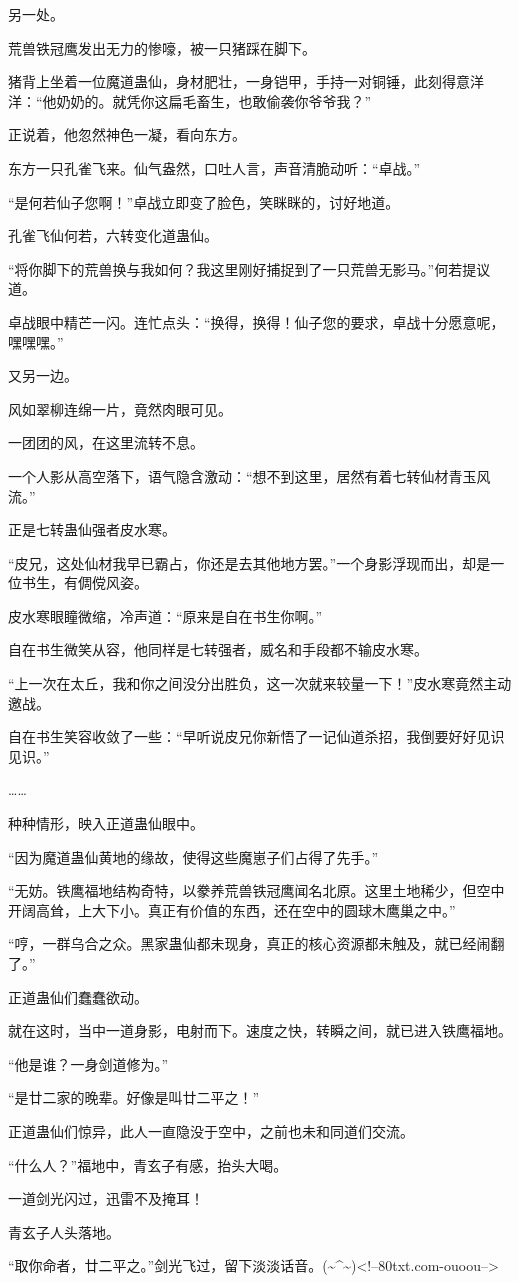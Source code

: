 \begin{this_body}
另一处。

荒兽铁冠鹰发出无力的惨嚎，被一只猪踩在脚下。

猪背上坐着一位魔道蛊仙，身材肥壮，一身铠甲，手持一对铜锤，此刻得意洋洋：“他奶奶的。就凭你这扁毛畜生，也敢偷袭你爷爷我？”

正说着，他忽然神色一凝，看向东方。

东方一只孔雀飞来。仙气盎然，口吐人言，声音清脆动听：“卓战。”

“是何若仙子您啊！”卓战立即变了脸色，笑眯眯的，讨好地道。

孔雀飞仙何若，六转变化道蛊仙。

“将你脚下的荒兽换与我如何？我这里刚好捕捉到了一只荒兽无影马。”何若提议道。

卓战眼中精芒一闪。连忙点头：“换得，换得！仙子您的要求，卓战十分愿意呢，嘿嘿嘿。”

又另一边。

风如翠柳连绵一片，竟然肉眼可见。

一团团的风，在这里流转不息。

一个人影从高空落下，语气隐含激动：“想不到这里，居然有着七转仙材青玉风流。”

正是七转蛊仙强者皮水寒。

“皮兄，这处仙材我早已霸占，你还是去其他地方罢。”一个身影浮现而出，却是一位书生，有倜傥风姿。

皮水寒眼瞳微缩，冷声道：“原来是自在书生你啊。”

自在书生微笑从容，他同样是七转强者，威名和手段都不输皮水寒。

“上一次在太丘，我和你之间没分出胜负，这一次就来较量一下！”皮水寒竟然主动邀战。

自在书生笑容收敛了一些：“早听说皮兄你新悟了一记仙道杀招，我倒要好好见识见识。”

……

种种情形，映入正道蛊仙眼中。

“因为魔道蛊仙黄地的缘故，使得这些魔崽子们占得了先手。”

“无妨。铁鹰福地结构奇特，以豢养荒兽铁冠鹰闻名北原。这里土地稀少，但空中开阔高耸，上大下小。真正有价值的东西，还在空中的圆球木鹰巢之中。”

“哼，一群乌合之众。黑家蛊仙都未现身，真正的核心资源都未触及，就已经闹翻了。”

正道蛊仙们蠢蠢欲动。

就在这时，当中一道身影，电射而下。速度之快，转瞬之间，就已进入铁鹰福地。

“他是谁？一身剑道修为。”

“是廿二家的晚辈。好像是叫廿二平之！”

正道蛊仙们惊异，此人一直隐没于空中，之前也未和同道们交流。

“什么人？”福地中，青玄子有感，抬头大喝。

一道剑光闪过，迅雷不及掩耳！

青玄子人头落地。

“取你命者，廿二平之。”剑光飞过，留下淡淡话音。(\~{}\^{}\~{})<!--80txt.com-ouoou-->

\end{this_body}

